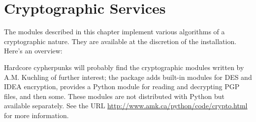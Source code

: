 \chapter{Cryptographic Services}
\label{crypto}

The modules described in this chapter implement various algorithms of
a cryptographic nature.  They are available at the discretion of the
installation.  Here's an overview:

\localmoduletable

Hardcore cypherpunks will probably find the cryptographic modules
written by A.M. Kuchling of further interest; the package adds
built-in modules for DES and IDEA encryption, provides a Python module
for reading and decrypting PGP files, and then some.  These modules
are not distributed with Python but available separately.  See the URL
\url{http://www.amk.ca/python/code/crypto.html} 
for more information.
